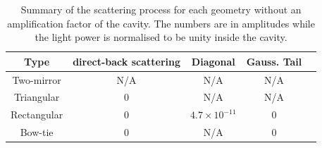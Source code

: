 \begin{table}
\begin{center}
\begin{tabular}{|c|c|c|c|c|}
\hline
Type        & direct-back scattering &  Diagonal & Gauss. Tail \\ \hline
Two-mirror   &   N/A  &  N/A   & N/A   \\ \hline
Triangular     & $0$ &  N/A    & N/A   \\ \hline
Rectangular  &  $0$ &  $4.7\times 10^{-11}$ & 0\\ \hline
Bow-tie        &  $0$ &  N/A  & 0    \\ \hline
\end{tabular}
\caption{Summary of the scattering process for each geometry without
an amplification factor of the cavity.
The numbers are in amplitudes while the light power is normalised
to be unity inside the cavity.}
\label{table:summary}
\end{center}
\end{table}

